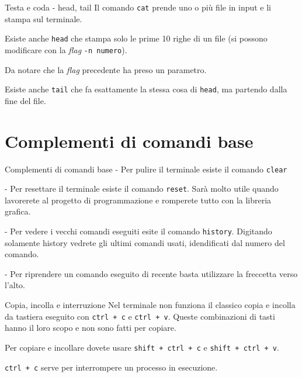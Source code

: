 \documentclass{beamer}
\begin{document}
\begin{frame}{Testa e coda - head, tail}
  Il comando \texttt{cat} prende uno o più file in input e li stampa sul 
  terminale.\bigskip

  Esiste anche \texttt{head} che stampa solo le prime 10 righe di un file (si
  possono modificare con la \textit{flag} \texttt{-n numero}).\medskip

  Da notare che la \textit{flag} precedente ha preso un parametro.\bigskip

  Esiste anche \texttt{tail} che fa esattamente la stessa cosa di \texttt{head}, 
  ma partendo dalla fine del file.
\end{frame}

\section{Complementi di comandi base}

\begin{frame}{Complementi di comandi base}
  - Per pulire il terminale esiste il comando \texttt{clear}\bigskip

  - Per resettare il terminale esiste il comando \texttt{reset}. Sarà molto utile
  quando lavorerete al progetto di programmazione e romperete tutto con 
  la libreria grafica.\bigskip

  - Per vedere i vecchi comandi eseguiti esite il comando \texttt{history}.
    Digitando solamente history vedrete gli ultimi comandi usati, idendificati 
    dal numero del comando. \bigskip

  - Per riprendere un comando eseguito di recente basta utilizzare la freccetta
  verso l'alto. \bigskip
\end{frame}

\begin{frame}{Copia, incolla e interruzione}
  Nel terminale non funziona il classico copia e incolla da tastiera eseguito
  con \texttt{ctrl + c} e \texttt{ctrl + v}. Queste combinazioni di tasti hanno 
  il loro scopo e non sono fatti per copiare.\bigskip

  Per copiare e incollare dovete usare \texttt{shift + ctrl + c} e 
  \texttt{shift + ctrl + v}.\bigskip

  \texttt{ctrl + c} serve per interrompere un processo in esecuzione.
\end{frame}
\end{document}
